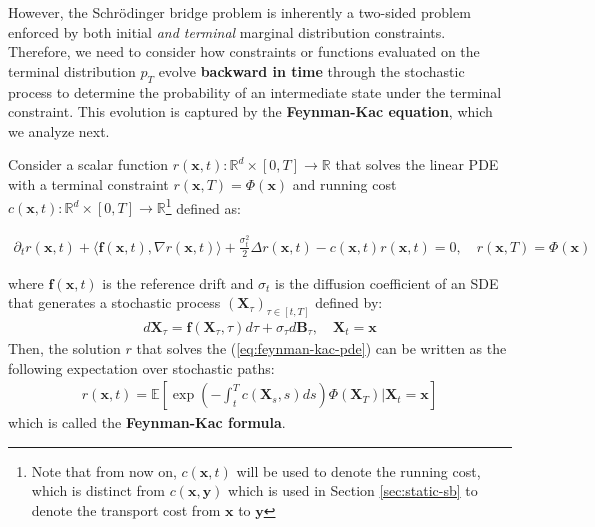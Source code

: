 \documentclass{article}
\newcommand{\boldtext}[1]{\textbf{\textcolor{MyGreen}{#1}}}
\begin{document}
However, the Schrödinger bridge problem is inherently a two-sided problem enforced by both initial \textit{and terminal} marginal distribution constraints. Therefore, we need to consider how constraints or functions evaluated on the terminal distribution $p_T$ evolve \textbf{backward in time} through the stochastic process to determine the probability of an intermediate state under the terminal constraint. This evolution is captured by the \boldtext{Feynman-Kac equation}, which we analyze next.

\begin{theorem}\label{thm:feynman-kac}
    Consider a scalar function $r(\boldsymbol{x},t):\mathbb{R}^d\times[0,T]\to \mathbb{R}$ that solves the linear PDE with a terminal constraint $r(\boldsymbol{x},T)=\Phi(\boldsymbol{x})$ and running cost $c(\boldsymbol{x},t):\mathbb{R}^d\times[0,T] \to \mathbb{R}$\footnote{Note that from now on, $c(\boldsymbol{x},t)$ will be used to denote the running cost, which is distinct from $c(\boldsymbol{x},\boldsymbol{y})$ which is used in Section \ref{sec:static-sb} to denote the transport cost from $\boldsymbol{x}$ to $\boldsymbol{y}$} defined as:
    \begin{small}
    \begin{align}
        \partial_tr(\boldsymbol{x},t)+\langle\boldsymbol{f}(\boldsymbol{x},t), \nabla r(\boldsymbol{x},t)\rangle + \frac{\sigma_t^2}{2}\Delta r(\boldsymbol{x},t)-c(\boldsymbol{x},t)r(\boldsymbol{x},t)=0, \quad r(\boldsymbol{x},T)=\Phi(\boldsymbol{x})\tag{Feynman-Kac PDE}\label{eq:feynman-kac-pde}
    \end{align}
    \end{small}
    where $\boldsymbol{f}(\boldsymbol{x},t)$ is the reference drift and $\sigma_t$ is the diffusion coefficient of an SDE that generates a stochastic process $(\boldsymbol{X}_\tau)_{\tau\in [t,T]}$ defined by:
    \begin{align}
        d\boldsymbol{X}_\tau=\boldsymbol{f}(\boldsymbol{X}_\tau,\tau)d\tau+ \sigma_\tau d\boldsymbol{B}_\tau,\quad \boldsymbol{X}_t=\boldsymbol{x}\label{eq:feynman-kac-sde}
    \end{align}
    Then, the solution $r$ that solves the (\ref{eq:feynman-kac-pde}) can be written as the following expectation over stochastic paths:
    \begin{align}
        r(\boldsymbol{x},t)=\mathbb{E}\left[\exp \left(-\int_t^Tc(\boldsymbol{X}_s,s)ds\right)\Phi(\boldsymbol{X}_T)\bigg|\boldsymbol{X}_t=\boldsymbol{x}\right]\tag{Feynman-Kac Formula}\label{eq:feynman-kac-formula}
    \end{align}
    which is called the \textbf{Feynman-Kac formula}.
\end{theorem}
\end{document}

